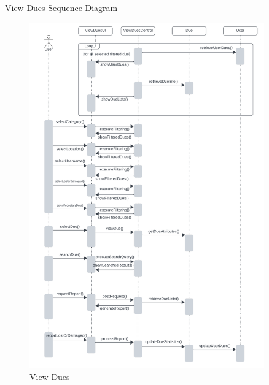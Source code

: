 \documentclass[20pt]{beamer}
\numberwithin{figure}{section}
\begin{document}
\begin{frame}{View Dues Sequence Diagram}

     \begin{figure}
        \centering
        \includegraphics[width= 0.9\textwidth , height= 0.6\paperheight]{ViewDuesSeq.png}
        \caption{View Dues}
        \label{fig:34}
    \end{figure}

\end{frame}
\end{document}
